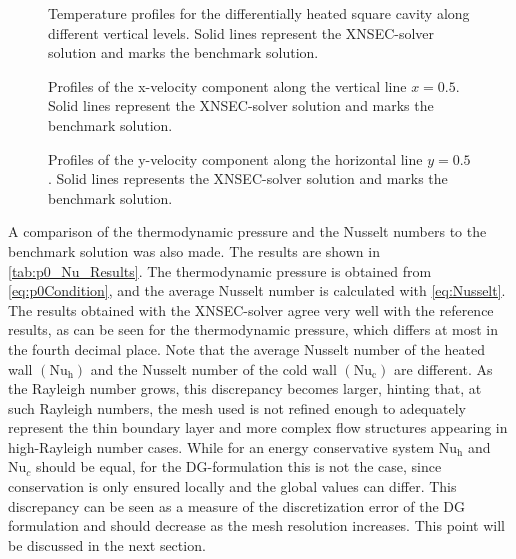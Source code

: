 \begin{figure}[h]
	\centering
	\pgfplotsset{width=0.22\textwidth, compat=1.3} 
	\caption{Temperature profiles for the differentially heated square cavity along different vertical levels. Solid lines represent the XNSEC-solver solution and marks the benchmark solution.}
	\label{fig:TempProfile}
\end{figure}
%
\begin{figure}[h]
	\centering
	\pgfplotsset{width=0.22\textwidth, compat=1.3}
	\caption{Profiles of the x-velocity component along the vertical line $x=0.5$. Solid lines represent the XNSEC-solver solution and marks the benchmark solution.}
	\label{fig:VelocityXProfile}
\end{figure}
%
\begin{figure}[h]
	\centering
	\pgfplotsset{width=0.22\textwidth, compat=1.3}
	\caption{Profiles of the y-velocity component along the horizontal line $y=0.5$. Solid lines represents the XNSEC-solver solution and marks the benchmark solution.}
	\label{fig:VelocityYProfile}
\end{figure}
\FloatBarrier
A comparison of the thermodynamic pressure and the Nusselt numbers to the benchmark solution was also made. The results are shown in \cref{tab:p0_Nu_Results}.  The thermodynamic pressure is obtained from \cref{eq:p0Condition}, and the average Nusselt number is calculated with \cref{eq:Nusselt}. The results obtained with the XNSEC-solver agree very well with the reference results, as can be seen for the thermodynamic pressure, which differs at most in the fourth decimal place. Note that the average Nusselt number of the heated wall $(\text{Nu}_\text{h})$ and the Nusselt number of the cold wall $(\text{Nu}_\text{c})$ are different. As the Rayleigh number grows, this discrepancy becomes larger, hinting that, at such Rayleigh numbers, the mesh used is not refined enough to adequately represent the thin boundary layer and more complex flow structures appearing in high-Rayleigh number cases. While for an energy conservative system $\text{Nu}_\text{h}$ and $\text{Nu}_c$ should be equal, for the DG-formulation this is not the case, since conservation is only ensured locally and the global values can differ. This discrepancy can be seen as a measure of the discretization error of the DG formulation and should decrease as the mesh resolution increases. This point will be discussed in the next section.
